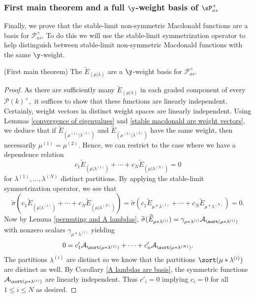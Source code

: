 \subsubsection{First main theorem and a full $\y$-weight basis of $\sP_{as}^{+}$}

Finally, we prove that the stable-limit non-symmetric Macdonald functions are a basis for $\mathscr{P}_{as}^{+}$. To do this we will use the stable-limit symmetrization operator to help distinguish between stable-limit non-symmetric Macdonald functions with the same $\y$-weight. 

\begin{thm}(First main theorem) \label{main theorem}
The $\widetilde{E}_{(\mu|\lambda)}$ are a $\y$-weight basis for $\mathscr{P}_{as}^{+}$.
\end{thm}

\begin{proof}
As there are sufficiently many $\widetilde{E}_{(\mu|\lambda)}$ in each graded component of every $\mathscr{P}(k)^{+},$ it suffices to show that these functions are linearly independent. Certainly, weight vectors in distinct weight spaces are linearly independent. Using Lemmas \ref{convergence of eigenvalues} and \ref{stable macdonald are weight vectors}, we deduce that if $\widetilde{E}_{(\mu^{(1)}|\lambda^{(1)})}$ and $\widetilde{E}_{(\mu^{(2)}|\lambda^{(2)})}$ have the same weight, then necessarily $\mu^{(1)} = \mu^{(2)}$. Hence, we can restrict to the case where we
have a dependence relation
$$ c_1\widetilde{E}_{(\mu|\lambda^{(1)})} +\cdots + c_N \widetilde{E}_{(\mu|\lambda^{(N)})} = 0 $$
for $\lambda^{(1)},\ldots,\lambda^{(N)}$ distinct partitions.
By applying the stable-limit symmetrization operator, we see that 
$$ \widetilde{\sigma}(c_1\widetilde{E}_{(\mu|\lambda^{(1)})} +\cdots + c_N \widetilde{E}_{(\mu|\lambda^{(N)})} ) = \widetilde{\sigma}(c_1\widetilde{E}_{\mu*\lambda^{(1)}} +\cdots+c_N \widetilde{E}_{\mu*\lambda^{(N)}}) = 0 .$$
Now by Lemma \ref{permuting and A lambdas}, $\widetilde{\sigma}(\widetilde{E}_{\mu*\lambda^{(i)}}) = \gamma_{\mu*\lambda^{(i)}}  \mathcal{A}_{\sort(\mu*\lambda^{(i)})} $ with nonzero scalars  $\gamma_{\mu*\lambda^{(i)}}$ yielding 
$$ 0 = c'_1\mathcal{A}_{\sort(\mu*\lambda^{(1)})} +\cdots+ c'_n \mathcal{A}_{\sort(\mu*\lambda^{(N)})}.$$ The partitions $\lambda^{(i)}$ are distinct so we know that the partitions $\sort(\mu*\lambda^{(i)})$ are distinct as well. By Corollary \ref{A lambdas are basis}, the symmetric functions $\mathcal{A}_{\sort(\mu*\lambda^{(i)})}$ are linearly independent. Thus $c'_i = 0$ implying $c_i = 0$ for all $1 
\leq i \leq N$ as desired.
\end{proof}
